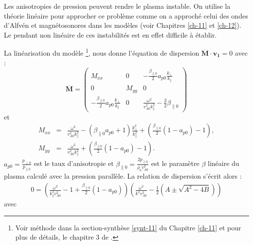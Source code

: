 Les anisotropies de pression peuvent rendre le plasma instable. On utilise la théorie linéaire pour approcher ce problème comme on a approché celui des ondes d'Alfvén et magnétosonores dans les modèles  (voir Chapitres \ref{ch-11} et \ref{ch-12}). Le pendant non linéaire de ces instabilités est en effet difficile à établir. 

La linéarisation du modèle \footnote{Voir méthode dans la section-synthèse \ref{synt-11} du Chapitre \ref{ch-11} et pour plus de détails, le chapitre 3 de \cite{hunana_introductory_2019}.}, nous donne l'équation de dispersion $\overline{\boldsymbol{M}}\cdot \boldsymbol{v_1} = 0$ avec : 
\begin{equation}
 \overline{\boldsymbol{M}} =    \begin{pmatrix}
\label{eq:lin_cpg_eqdis}  M_{xx}   & 0 & -  \frac{\beta_{\parallel 0}}{2} a_{p0}  \frac{k_{\perp}}{k_{\parallel}} \\
    0 &  M_{yy} & 0 \\
      - \frac{\beta_{\parallel 0}}{2} a_{p0} \frac{k_{\perp}}{k_{\parallel}} & 0 &\frac{\omega^2}{ v^2_{A0}k^2_{\parallel}} -  \frac{3}{2} \beta_{\parallel 0}  
    \end{pmatrix} 
\end{equation}
et 
\begin{eqnarray*}
    M_{xx} &=& \frac{\omega^2}{v^2_{A0}k^2_{\parallel}} -  \left(\beta_{\parallel 0} a_{p0}+1\right)  \frac{k^2_{\perp}}{k^2_{\parallel}} +   \left(\frac{\beta_{\parallel 0}}{2} \left(1-a_{p0}\right)-1\right) , \\
    M_{yy}& =& \frac{\omega^2}{v^2_{A0}k^2_{\parallel}} +   \left(\frac{\beta_{\parallel 0}}{2} \left(1-a_{p0}\right)-1\right) .
\end{eqnarray*}
$a_{p0} = \frac{p_{\perp 0}}{p_{\parallel 0}}$ est le taux d'anisotropie et $\beta_{\parallel 0} = \frac{2 p_{\parallel 0}}{\rho_0 v^2_{A0}}$ est le paramètre $\beta$ linéaire du plasma calculé avec la pression parallèle. La relation de dispersion s'écrit alors : 
\begin{eqnarray}
 \label{eq:lin_cpg_disp}   0 = \left(\frac{\omega^2}{k^2_{\parallel} v^2_{A0}} - 1 +   \frac{\beta_{\parallel 0}}{2} \left(1-a_{p0}\right) \right)\left(\frac{\omega^2}{k^2 v^2_{A0}} - \frac{1}{2}\left(A \pm \sqrt{A^2-4B}\right)\right)
\end{eqnarray}
avec 
